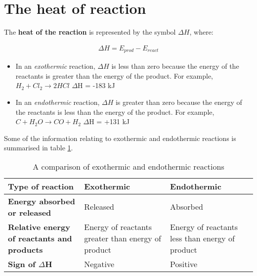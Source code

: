 \section{The heat of reaction}

The \textbf{heat of the reaction} is represented by the symbol $\Delta H$, where: 

\begin{eqnarray*}
  \Delta H = E_{prod} - E_{react}
\end{eqnarray*}

\begin{itemize}
\item{In an \textit{exothermic} reaction, $\Delta H$ is less than zero because the energy of the reactants is greater than the energy of the product. For example,\\

\rm${H_{2} + Cl_{2} \rightarrow 2HCl}$   $\Delta$H = -183 kJ
}
\item{In an \textit{endothermic} reaction, $\Delta H$ is greater than zero because the energy of the reactants is less than the energy of the product. For example, \\

\rm${C + H_{2}O \rightarrow CO + H_{2}}$   $\Delta$H = +131 kJ
}
\end{itemize}

Some of the information relating to exothermic and endothermic reactions is summarised in table \ref{tab:energy}.


\begin{table}[h]
\begin{center}
\caption{A comparison of exothermic and endothermic reactions}
\label{tab:energy}
\begin{tabular}{|p{4cm}|p{4cm}|p{4cm}|}\hline
\textbf{Type of reaction} & \textbf{Exothermic} & \textbf{Endothermic} \\\hline
\textbf{Energy absorbed or released} & Released & Absorbed \\\hline
\textbf{Relative energy of reactants and products} & Energy of reactants greater than energy of product & Energy of reactants less than energy of product \\\hline
\textbf{Sign of $\Delta$H} & Negative & Positive \\\hline
\end{tabular}
\end{center}
\end{table}


